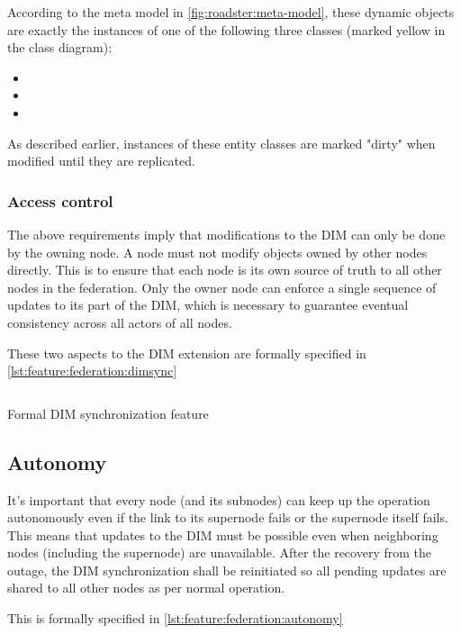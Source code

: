 According to the meta model in \autoref{fig:roadster:meta-model}, these dynamic
objects are exactly the instances of one of the following three
classes (marked yellow in the class diagram):
\begin{itemize}
	\item {}
	\item {}
	\item {}
\end{itemize}

As described earlier, instances of these entity classes are marked "dirty" when
modified until they are replicated.

\subsubsection{Access control}
The above requirements imply that modifications to the \gls{DIM} can only be done by the
owning node. A node
must not modify objects owned by other nodes directly. This is to ensure that each node is its own source of truth
to all other nodes in the federation. Only the owner node can enforce a single
sequence of updates to its part of the DIM, which is necessary to guarantee
eventual consistency \cite[Chapter 5, Reliable Pub-Sub (Clone Pattern), Republishing
Updates from Clients]{zmq:zguide} across all actors of all nodes.

These two aspects to the DIM extension are formally specified in \autoref{lst:feature:federation:dimsync}

\begin{listing}
	\inputminted{Gherkin}{listings/features/federation/dim_extension.feature}
	\caption{Formal DIM synchronization feature}
	\label{lst:feature:federation:dimsync}
\end{listing}

\subsection{Autonomy}
It's important that every node (and its subnodes) can keep up the operation autonomously even if the
link to its supernode fails or the supernode itself fails. This means that updates to
the \gls{DIM} must be possible even when neighboring nodes (including the supernode) are unavailable. After the
recovery from the outage, the \gls{DIM} synchronization shall be reinitiated so
all pending updates are shared to all other nodes as per normal operation.

This is formally specified in \autoref{lst:feature:federation:autonomy}

